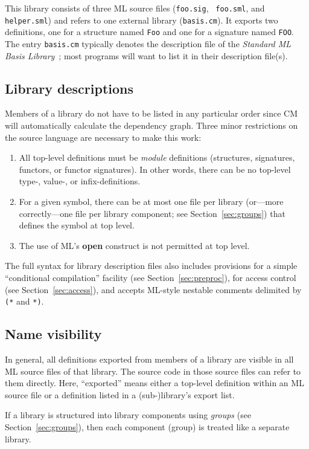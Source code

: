 \documentclass{article}
\begin{document}
This library consists of three ML source files ({\tt foo.sig}, {\tt
foo.sml}, and {\tt helper.sml}) and refers to one external library
({\tt basis.cm}).  It exports two definitions, one for a structure
named {\tt Foo} and one for a signature named {\tt FOO}.  The entry
{\tt basis.cm} typically denotes the description file of the {\it
Standard ML Basis Library}~\cite{reppy99:basis}; most programs will
want to list it in their description file(s).

\subsection{Library descriptions}

Members of a library do not have to be listed in any particular order
since CM will automatically calculate the dependency graph.  Three
minor restrictions on the source language are necessary to make this
work:
\begin{enumerate}
\item All top-level definitions must be {\em module} definitions
(structures, signatures, functors, or functor signatures).  In other
words, there can be no top-level type-, value-, or infix-definitions.
\item For a given symbol, there can be at most one file per library
(or---more correctly---one file per library component; see
Section~\ref{sec:groups}) that defines the symbol at top level.
\item The use of ML's {\bf open} construct is not permitted at top
level.
\end{enumerate}

The full syntax for library description files also includes provisions
for a simple ``conditional compilation'' facility (see
Section~\ref{sec:preproc}), for access control (see
Section~\ref{sec:access}), and accepts ML-style nestable comments
delimited by \verb|(*| and \verb|*)|.

\subsection{Name visibility}

In general, all definitions exported from members of a library are
visible in all ML source files of that library.  The source code in
those source files can refer to them directly.  Here, ``exported''
means either a top-level definition within an ML source file or a
definition listed in a (sub-)library's export list.

If a library is structured into library components using {\em groups}
(see Section~\ref{sec:groups}), then each component (group) is treated
like a separate library.
\end{document}
